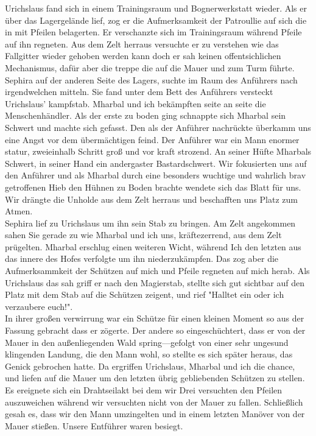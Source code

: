 \documentclass{book}
\begin{document}
    Urichslaus fand sich in einem Trainingsraum und Bognerwerkstatt wieder. Als er über das Lagergelände lief, zog er die Aufmerksamkeit der Patroullie auf sich die in mit Pfeilen belagerten. Er verschanzte sich im Trainingsraum während Pfeile auf ihn regneten. Aus dem Zelt herraus versuchte er zu verstehen wie das Fallgitter wieder gehoben werden kann doch er sah keinen offentsichlichen Mechanismus, dafür aber die treppe die auf die Mauer und zum Turm führte. Sephira auf der anderen Seite des Lagers, suchte im Raum des Anführers nach irgendwelchen mitteln. Sie fand unter dem Bett des Anführers versteckt Urichslaus' kampfstab. Mharbal und ich bekämpften seite an seite die Menschenhändler. Als der erste zu boden ging schnappte sich Mharbal sein Schwert und machte sich gefasst. Den als der Anführer nachrückte überkamm uns eine Angst vor dem übermächtigen feind. Der Anführer war ein Mann enormer statur, zweieinhalb Schritt groß und vor kraft strozend. An seiner Hüfte Mharbals Schwert, in seiner Hand ein andergaster Bastardschwert. Wir fokusierten uns auf den Anführer und als Mharbal durch eine besonders wuchtige und wahrlich brav getroffenen Hieb den Hühnen zu Boden brachte wendete sich das Blatt für uns. Wir drängte die Unholde aus dem Zelt herraus und beschafften uns Platz zum Atmen.\\
    Sephira lief zu Urichslaus um ihn sein Stab zu bringen. Am Zelt angekommen sahen Sie gerade zu wie Mharbal und ich uns, kräftezerrend,  aus dem Zelt prügelten. Mharbal erschlug einen weiteren Wicht, während Ich den letzten aus das innere des Hofes verfolgte um ihn niederzukämpfen. Das zog aber die Aufmerksammkeit der Schützen auf mich und Pfeile regneten auf mich herab. Als Urichslaus das sah griff er nach den Magierstab, stellte sich gut sichtbar auf den Platz mit dem Stab auf die Schützen zeigent, und rief "Halltet ein oder ich verzaubere euch!".\\
    In ihrer großen verwirrung war ein Schütze für einen kleinen Moment so aus der Fassung gebracht dass er zögerte. Der andere so eingeschüchtert, dass er von der Mauer in den außenliegenden Wald spring---gefolgt von einer sehr ungesund klingenden Landung, die den Mann wohl, so stellte es sich später heraus, das Genick gebrochen hatte. Da ergriffen Urichslaus, Mharbal und ich die chance, und liefen auf die Mauer um den letzten übrig gebliebenden Schützen zu stellen. Es ereignete sich ein Drahtseilakt bei dem wir Drei versuchten den Pfeilen auszuweichen während wir versuchten nicht von der Mauer zu fallen. Schließlich gesah es, dass wir den Mann umzingelten und in einem letzten Manöver von der Mauer stießen. Unsere Entführer waren besiegt.\\
\end{document}
